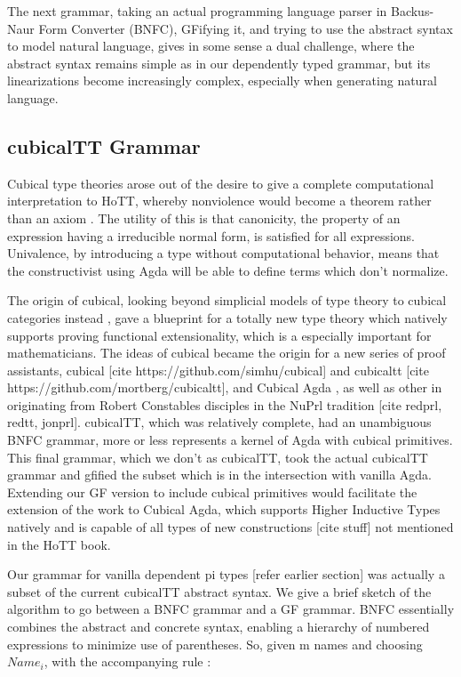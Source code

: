 The next grammar, taking an actual programming language
parser in Backus-Naur Form Converter (BNFC), GFifying it, and trying to use the
abstract syntax to model natural language, gives in some sense a dual challenge,
where the abstract syntax remains simple as in our dependently typed grammar,
but its linearizations become increasingly complex, especially when generating
natural language.

\subsection{cubicalTT Grammar}

Cubical type theories arose out of the desire to give a complete computational
interpretation to HoTT, whereby nonviolence would become a theorem rather than
an axiom \cite{cohen:hal-01378906}. The utility of this is that canonicity, the
property of an expression having a irreducible normal form, is satisfied for all
expressions. Univalence, by introducing a type without computational behavior,
means that the constructivist using Agda will be able to define terms which
don't normalize.

The origin of cubical, looking beyond simplicial models of type theory to
cubical categories instead \cite{bezem2017univalence}, gave a blueprint for a
totally new type theory which natively supports proving functional
extensionality, which is a especially important for mathematicians. The ideas of
cubical became the origin for a new series of proof assistants, cubical [cite
https://github.com/simhu/cubical] and cubicaltt [cite
https://github.com/mortberg/cubicaltt], and Cubical Agda \cite{cubicalAgda}, as
well as other in originating from Robert Constables disciples in the NuPrl
tradition [cite redprl, redtt, jonprl]. cubicalTT, which was relatively
complete, had an unambiguous BNFC grammar, more or less represents a kernel of
Agda with cubical primitives. This final grammar, which we don't as cubicalTT,
took the actual cubicalTT grammar and gfified the subset which is in the
intersection with vanilla Agda. Extending our GF version to include cubical
primitives would facilitate the extension of the work to Cubical Agda, which
supports Higher Inductive Types natively and is capable of all types of new
constructions [cite stuff] not mentioned in the HoTT book.

Our grammar for vanilla dependent pi types [refer earlier section] was actually
a subset of the current cubicalTT abstract syntax. We give a brief sketch of the
algorithm to go between a BNFC grammar and a GF grammar. BNFC essentially
combines the abstract and concrete syntax, enabling a hierarchy of numbered
expressions  to minimize use of parentheses. So, given m names and
choosing $Name_i$, with the accompanying rule :

